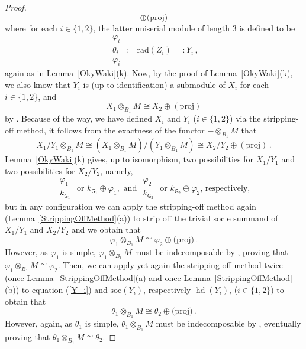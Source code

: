 \documentclass[12pt,a4paper]{amsart}
\theoremstyle{plain}\newtheorem{Theorem}{Theorem}[section]
\theoremstyle{plain}\newtheorem{Conjecture}[Theorem]{Conjecture}
\theoremstyle{plain}\newtheorem{Corollary}[Theorem]{Corollary}
\theoremstyle{plain}\newtheorem{Lemma}[Theorem]{Lemma}
\theoremstyle{plain}\newtheorem{Proposition}[Theorem]{Proposition}
\theoremstyle{definition}\newtheorem{Definition}[Theorem]{Definition}
\theoremstyle{definition}\newtheorem{Example}[Theorem]{Example}
\theoremstyle{definition}\newtheorem{Examples}[Theorem]{Examples}
\theoremstyle{definition}\newtheorem{Remark}[Theorem]{Remark}
\theoremstyle{definition}\newtheorem{Question}[Theorem]{Question}
\theoremstyle{definition}\newtheorem{Notation}[Theorem]{Notation}
\theoremstyle{definition}\newtheorem{Hypothesis}[Theorem]{Hypothesis}
\theoremstyle{definition}\newtheorem{Assumption}[Theorem]{Assumption}
\theoremstyle{definition}\newtheorem{Strategy}[Theorem]{Strategy}
\theoremstyle{definition}\newtheorem{Contents}[Theorem]{Contents}
\theoremstyle{definition}\newtheorem{Computations}[Theorem]{Computations}
\theoremstyle{definition}\newtheorem{Equivalences}[Theorem]{Equivalences}
\theoremstyle{definition}\newtheorem{Notation/Definition}[Theorem]{Notation/Definition}
\theoremstyle{definition}\newtheorem{noth}[Theorem]{}
\theoremstyle{plain}\newtheorem{Step}[Theorem]{Step}
\def\rad{\mathrm{rad}}
\def\soc{\mathrm{soc}} \def\tenOS{\otimes_{\mathcal{O}S}} \def\Tr{\mathrm{Tr}}
\newcommand{\hd}{\operatorname{hd}}
\begin{document}
\begin{proof}
\begin{equation}
\oplus\text{(proj)}
\end{equation}
where for each $i\in\{1,2\}$, the latter uniserial module of length 3 is defined to be 
$$\boxed{\begin{matrix}\varphi_i\\ \theta_i\\ \varphi_i\end{matrix}}:=\rad(Z_{i})=:Y_{i}\,,$$
again as in Lemma~\ref{OkyWaki}(k).
Now, by the proof of Lemma~\ref{OkyWaki}(k), we also know that $Y_{i}$ is (up to identification) 
a submodule of $X_{i}$ for each $i\in\{1,2\}$, and 
$$X_{1}\otimes_{B_{1}}M\cong X_{2}\oplus (\text{proj})$$
by \cite[Lemma~3.4(d)]{KL20a}. Because of the way, we have defined $X_{i}$ and $Y_{i}$
 ($i\in\{1,2\}$) via the 
stripping-off method, it follows from the exactness of the functor $-\otimes_{B_{1}}M$ that 
$$X_{1}/Y_{1}\otimes_{B_{1}}M\cong  (X_{1}\otimes_{B_{1}}M)/(Y_{1}\otimes_{B_{1}}M)\cong X_{2}/Y_{2}\oplus (\text{proj})\,.$$ 
Lemma~\ref{OkyWaki}(k) gives, up to isomorphism, two possibilities for $X_{1}/Y_{1}$ and  two possibilities 
for $X_{2}/Y_{2}$, namely,
$$ \boxed{ \begin{matrix} \varphi_{1} \\ k_{\mathsf{G}_{1}}\end{matrix}}\text{ or }k_{\mathsf{G}_{1}}\oplus\varphi_{1}, \text{ and } \boxed{ \begin{matrix} \varphi_{2} \\ k_{\mathsf{G}_{2}}\end{matrix}}\text{ or }k_{\mathsf{G}_{2}}\oplus\varphi_{2}    \text{, respectively},$$
but in any configuration we can apply 
the stripping-off method again (Lemma~\ref{StrippingOffMethod}(a)) to strip off the trivial 
socle summand  of $X_{1}/Y_{1}$ and $X_{2}/Y_{2}$ and we obtain that
$$\varphi_{1}\otimes_{B_{1}}M\cong \varphi_{2}\oplus\text{(proj)}\,.$$
However, as $\varphi_{1}$ is simple, $\varphi_{1}\otimes_{B_{1}}M$ must be indecomposable 
by \cite[Theorem~2.1(a)]{KL20a}, 
proving that $\varphi_{1}\otimes_{B_{1}}M\cong \varphi_{2}$. Then, we can apply yet again the 
stripping-off method twice (once Lemma~\ref{StrippingOffMethod}(a) and once 
Lemma~\ref{StrippingOffMethod}(b)) to equation (\ref{Y_i}) and $\soc(Y_{i})$, 
respectively $\hd(Y_{i})$, ($i\in\{1,2\}$) to obtain that
$$\theta_{1}\otimes_{B_{1}}M\cong \theta_{2}\oplus\text{(proj)}\,.$$
However, again, as $\theta_{1}$ is simple, $\theta_{1}\otimes_{B_{1}}M$ must be indecomposable 
by \cite[Theorem~2.1(a)]{KL20a}, eventually proving that $\theta_{1}\otimes_{B_{1}}M\cong \theta_{2}$.
\end{proof}
\end{document}
